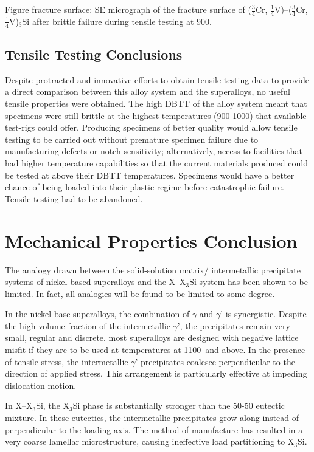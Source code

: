 %
Figure fracture surface: SE micrograph of the fracture surface of ($\frac{3}{4}$Cr, $\frac{1}{4}$V)--($\frac{3}{4}$Cr, $\frac{1}{4}$V)$_3$Si after brittle failure during tensile testing at 900\celsius.

\subsection{Tensile Testing Conclusions}

Despite protracted and innovative efforts to obtain tensile testing data to provide a direct comparison between this alloy system and the superalloys, no useful tensile properties were obtained.  The high DBTT of the alloy system meant that specimens were still brittle at the highest temperatures (900-1000\celsius) that available test-rigs could offer.  Producing specimens of better quality would allow tensile testing to be carried out without premature specimen failure due to manufacturing defects or notch sensitivity;  alternatively, access to facilities that had higher temperature capabilities so that the current materials produced could be tested at above their DBTT temperatures.  Specimens would have a better chance of being loaded into their plastic regime before catastrophic failure.  Tensile testing had to be abandoned.


\section{Mechanical Properties Conclusion}

The analogy drawn between the solid-solution matrix/ intermetallic precipitate systems of nickel-based superalloys and the X--X$_3$Si system has been shown to be limited.  In fact, all analogies will be found to be limited to some degree. 

In the nickel-base superalloys, the combination of $\gamma$ and $\gamma$’ is synergistic.  Despite the high volume fraction of the intermetallic $\gamma$’, the precipitates remain very small, regular and discrete. most superalloys are designed with negative lattice misfit if they are to be used at temperatures at 1100\celsius\ and above.  In the presence of tensile stress, the intermetallic $\gamma$' precipitates coalesce perpendicular to the direction of applied stress.  This arrangement is particularly effective at impeding dislocation motion.

In X--X$_3$Si, the X$_3$Si phase is substantially stronger than the 50-50 eutectic mixture.  In these eutectics, the intermetallic precipitates grow along instead of perpendicular to the loading axis.  The method of manufacture has resulted in a very coarse lamellar microstructure, causing ineffective load partitioning to X$_3$Si.

